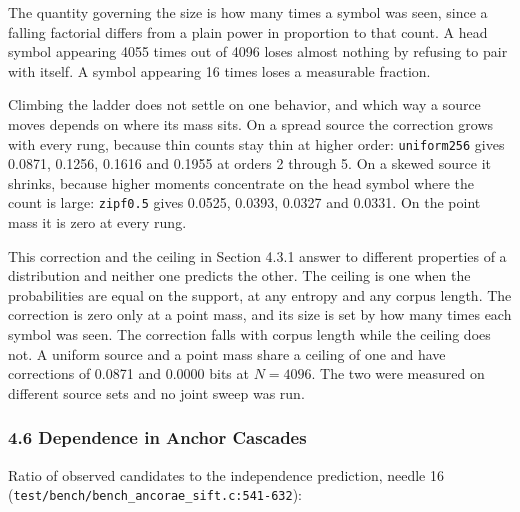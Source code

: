 The quantity governing the size is how many times a symbol was seen, since a falling factorial differs from a plain power in proportion to that count. A head symbol appearing 4055 times out of 4096 loses almost nothing by refusing to pair with itself. A symbol appearing 16 times loses a measurable fraction.

Climbing the ladder does not settle on one behavior, and which way a source moves depends on where its mass sits. On a spread source the correction grows with every rung, because thin counts stay thin at higher order: \texttt{uniform256} gives 0.0871, 0.1256, 0.1616 and 0.1955 at orders 2 through 5. On a skewed source it shrinks, because higher moments concentrate on the head symbol where the count is large: \texttt{zipf0.\allowbreak{}5} gives 0.0525, 0.0393, 0.0327 and 0.0331. On the point mass it is zero at every rung.

This correction and the ceiling in Section 4.3.1 answer to different properties of a distribution and neither one predicts the other. The ceiling is one when the probabilities are equal on the support, at any entropy and any corpus length. The correction is zero only at a point mass, and its size is set by how many times each symbol was seen. The correction falls with corpus length while the ceiling does not. A uniform source and a point mass share a ceiling of one and have corrections of 0.0871 and 0.0000 bits at \(N = 4096\). The two were measured on different source sets and no joint sweep was run.

\subsubsection{4.6 Dependence in Anchor Cascades}

Ratio of observed candidates to the independence prediction, needle 16 (\texttt{test/\allowbreak{}bench/\allowbreak{}bench\_\allowbreak{}ancorae\_\allowbreak{}sift.\allowbreak{}c:541-\allowbreak{}632}):

